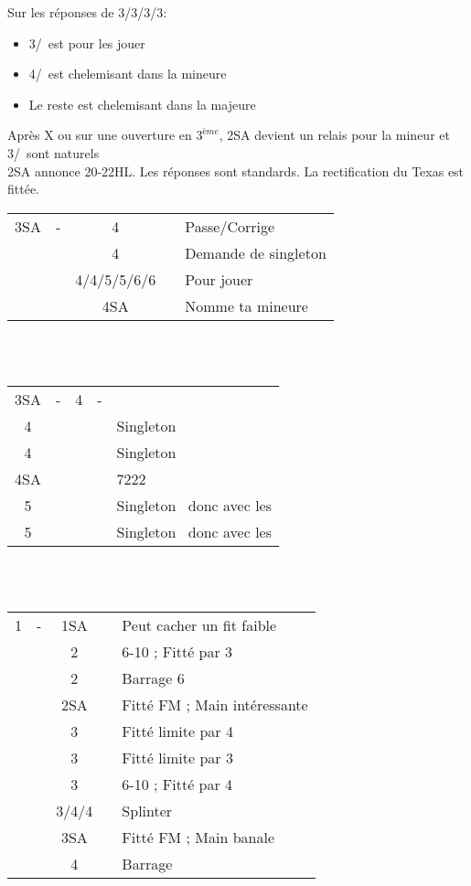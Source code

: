 \documentclass[a4paper, oneside, 11pt]{report}
\begin{document}
	Sur les réponses de 3\trefle/3\carreau/3\coeur/3\pique:
	\begin{itemize}
	\item 3\coeur/\pique\ est pour les jouer
	\item 4\trefle/\carreau\ est chelemisant dans la mineure
	\item Le reste est chelemisant dans la majeure\\
	\end{itemize}
	
	Après X ou sur une ouverture en $3^{ème}$, 2SA devient un relais pour la mineur et 3\trefle/\carreau\ sont naturels\\

	2SA annonce 20-22HL. Les réponses sont standards. La rectification du Texas est fittée.\\

	\begin{tabular}{cccc|l}
	3SA & - & 4\trefle && Passe/Corrige\\
	&& 4\carreau && Demande de singleton\\
	&& 4\coeur/4\pique/5\trefle/5\carreau/6\trefle/6\carreau && Pour jouer\\
	&& 4SA && Nomme ta mineure\\
	\end{tabular}\\\\
	
	\begin{tabular}{cccc|l}
	3SA & - & 4\carreau & - &\\
	4\coeur &&&& Singleton \coeur\\
	4\pique &&&& Singleton \pique\\
	4SA &&&& 7222\\
	5\trefle &&&& Singleton \carreau\ donc avec les \trefle\\
	5\carreau &&&& Singleton \trefle\ donc avec les \carreau\\
	\end{tabular}\\\\
	
	\begin{tabular}{cccc|l}
	1\coeur & - & 1SA && Peut cacher un fit faible\\
	&& 2\coeur && 6-10 ; Fitté par 3\\
	&& 2\pique && Barrage 6\pique\\
	&& 2SA && Fitté FM ; Main intéressante\\
	&& 3\trefle && Fitté limite par 4\\
	&& 3\carreau && Fitté limite par 3\\
	&& 3\coeur && 6-10 ; Fitté par 4\\
	&& 3\pique/4\trefle/4\carreau && Splinter\\
	&& 3SA && Fitté FM ; Main banale\\
	&& 4\coeur && Barrage\\
	\end{tabular}\\\\
\end{document}
